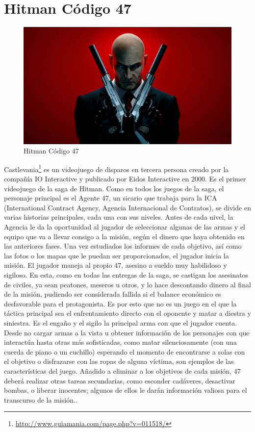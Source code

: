 \section{ Hitman Código 47}

\begin{figure}[htbp]
\begin{center}
\includegraphics[width=.60\textwidth]{./imagenes/hitman.jpg}
\caption{ Hitman Código 47}
\label{ Hitman Código 47}
\end{center}
\end{figure}
Castlevania\footnote{\url{http://www.guiamania.com/page.php?v=011518/}} es un videojuego de disparos en tercera persona creado por la compañía IO Interactive y publicado por Eidos Interactive en 2000. Es el primer videojuego de la saga de Hitman. Como en todos los juegos de la saga, el personaje principal es el Agente 47, un sicario que trabaja para la ICA (International Contract Agency, Agencia Internacional de Contratos), se divide en varias historias principales, cada una con sus niveles. Antes de cada nivel, la Agencia le da la oportunidad al jugador de seleccionar algunas de las armas y el equipo que va a llevar consigo a la misión, según el dinero que haya obtenido en las anteriores fases. Una vez estudiados los informes de cada objetivo, así como las fotos o los mapas que le puedan ser proporcionados, el jugador inicia la misión. El jugador maneja al propio 47, asesino a sueldo muy habilidoso y sigiloso. En esta, como en todas las entregas de la saga, se castigan los asesinatos de civiles, ya sean peatones, meseros u otros, y lo hace descontando dinero al final de la misión, pudiendo ser considerada fallida si el balance económico es desfavorable para el protagonista. Es por esto que no es un juego en el que la táctica principal sea el enfrentamiento directo con el oponente y matar a diestra y siniestra. Es el engaño y el sigilo la principal arma con que el jugador cuenta. Desde no cargar armas a la vista u obtener información de los personajes con que interactúa hasta otras más sofisticadas, como matar silenciosamente (con una cuerda de piano o un cuchillo) esperando el momento de encontrarse a solas con el objetivo o disfrazarse con las ropas de alguna víctima, son ejemplos de las características del juego. Añadido a eliminar a los objetivos de cada misión, 47 deberá realizar otras tareas secundarias, como esconder cadáveres, desactivar bombas, o liberar inocentes; algunos de ellos le darán información valiosa para el transcurso de la misión..

